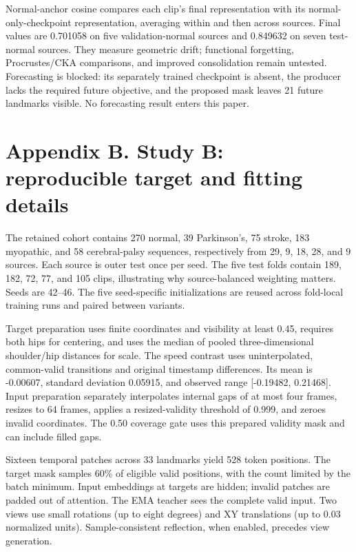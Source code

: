 \documentclass{article}
\begin{document}
Normal-anchor cosine compares each clip's final representation with its
normal-only-checkpoint representation, averaging within and then across
sources. Final values are 0.701058 on five validation-normal sources and
0.849632 on seven test-normal sources. They measure geometric drift;
functional forgetting, Procrustes/CKA comparisons, and improved
consolidation remain untested. Forecasting is blocked: its separately
trained checkpoint is absent, the producer lacks the required future
objective, and the proposed mask leaves 21 future landmarks visible. No
forecasting result enters this paper.

\section{Appendix B. Study B: reproducible target and fitting
details}\label{appendix-b.-study-b-reproducible-target-and-fitting-details}

The retained cohort contains 270 normal, 39 Parkinson's, 75 stroke, 183
myopathic, and 58 cerebral-palsy sequences, respectively from 29, 9, 18,
28, and 9 sources. Each source is outer test once per seed. The five
test folds contain 189, 182, 72, 77, and 105 clips, illustrating why
source-balanced weighting matters. Seeds are 42--46. The five
seed-specific initializations are reused across fold-local training runs
and paired between variants.

Target preparation uses finite coordinates and visibility at least 0.45,
requires both hips for centering, and uses the median of pooled
three-dimensional shoulder/hip distances for scale. The speed contrast
uses uninterpolated, common-valid transitions and original timestamp
differences. Its mean is -0.00607, standard deviation 0.05915, and
observed range {[}-0.19482, 0.21468{]}. Input preparation separately
interpolates internal gaps of at most four frames, resizes to 64 frames,
applies a resized-validity threshold of 0.999, and zeroes invalid
coordinates. The 0.50 coverage gate uses this prepared validity mask and
can include filled gaps.

Sixteen temporal patches across 33 landmarks yield 528 token positions.
The target mask samples 60\% of eligible valid positions, with the count
limited by the batch minimum. Input embeddings at targets are hidden;
invalid patches are padded out of attention. The EMA teacher sees the
complete valid input. Two views use small rotations (up to eight
degrees) and XY translations (up to 0.03 normalized units).
Sample-consistent reflection, when enabled, precedes view generation.
\end{document}
